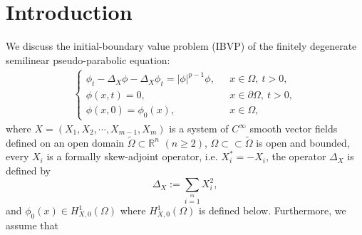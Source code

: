 \documentclass[11pt,a4paper]{article}
\numberwithin{equation}{section}
\newcommand{\ds}{\displaystyle}
\numberwithin{remark}{section}
\begin{document}
\section{Introduction}
\quad\quad We discuss the initial-boundary value problem (IBVP) of the finitely degenerate semilinear pseudo-parabolic equation:
\begin{align}\label{1.1}
 \left\{\begin{array}{ll}
     \ds \phi_{t}-\Delta_X\phi-\Delta_X\phi_t=|\phi|^{p-1}\phi,\ \ \ &x\in\Omega,\ t>0,\\
     \ds \phi(x,t)=0,&x\in\partial\Omega,\ t>0,\\
     \ds \phi(x,0)=\phi_0(x),\ \ &x\in\Omega,
    \end{array}\right.
\end{align}
where $X=(X_1,X_2,\cdots,X_{m-1},X_m)$ is a system of $C^\infty$ smooth vector fields defined on an open domain $\tilde{\Omega}\subset\mathbb{R}^n$ $(n\geq2)$, $\Omega\subset\subset \tilde{\Omega}$ is open and bounded, every $X_i$ is a formally skew-adjoint operator, i.e. $X_i^*=-X_i$, the operator $\Delta_X$ is defined by
\begin{equation*}
\Delta_X:=\sum\limits_{i=1}\limits^{m}X_i^2,
\end{equation*}
and $\phi_0(x)\in H_{X,0}^1(\Omega)$ where $H_{X,0}^1(\Omega)$ is defined below. Furthermore, we assume that
\end{document}
